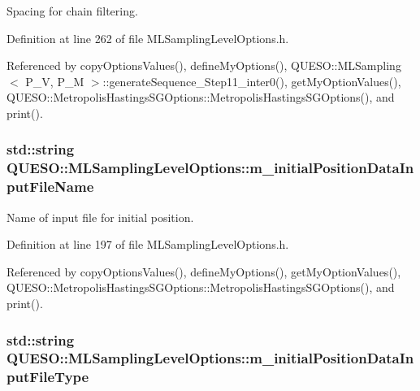 Spacing for chain filtering. 



Definition at line 262 of file M\-L\-Sampling\-Level\-Options.\-h.



Referenced by copy\-Options\-Values(), define\-My\-Options(), Q\-U\-E\-S\-O\-::\-M\-L\-Sampling$<$ P\-\_\-\-V, P\-\_\-\-M $>$\-::generate\-Sequence\-\_\-\-Step11\-\_\-inter0(), get\-My\-Option\-Values(), Q\-U\-E\-S\-O\-::\-Metropolis\-Hastings\-S\-G\-Options\-::\-Metropolis\-Hastings\-S\-G\-Options(), and print().

\hypertarget{class_q_u_e_s_o_1_1_m_l_sampling_level_options_ac27dd9d3b5a376bfd146caa62fa32613}{
\subsubsection[{m\-\_\-initial\-Position\-Data\-Input\-File\-Name}]{\setlength{\rightskip}{0pt plus 5cm}std\-::string Q\-U\-E\-S\-O\-::\-M\-L\-Sampling\-Level\-Options\-::m\-\_\-initial\-Position\-Data\-Input\-File\-Name}}\label{class_q_u_e_s_o_1_1_m_l_sampling_level_options_ac27dd9d3b5a376bfd146caa62fa32613}


Name of input file for initial position. 



Definition at line 197 of file M\-L\-Sampling\-Level\-Options.\-h.



Referenced by copy\-Options\-Values(), define\-My\-Options(), get\-My\-Option\-Values(), Q\-U\-E\-S\-O\-::\-Metropolis\-Hastings\-S\-G\-Options\-::\-Metropolis\-Hastings\-S\-G\-Options(), and print().

\hypertarget{class_q_u_e_s_o_1_1_m_l_sampling_level_options_a582573c99a718b1eefe417c0cccf071f}{
\subsubsection[{m\-\_\-initial\-Position\-Data\-Input\-File\-Type}]{\setlength{\rightskip}{0pt plus 5cm}std\-::string Q\-U\-E\-S\-O\-::\-M\-L\-Sampling\-Level\-Options\-::m\-\_\-initial\-Position\-Data\-Input\-File\-Type}}\label{class_q_u_e_s_o_1_1_m_l_sampling_level_options_a582573c99a718b1eefe417c0cccf071f}


